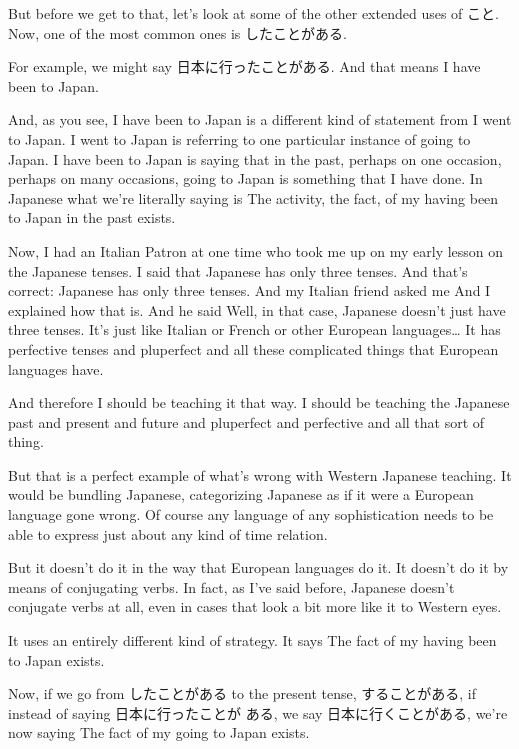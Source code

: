But before we get to that, let's look at some of the other extended uses of こと. Now, one of the most common ones is したことがある.{}

For example, we might say 日本に行ったことがある. And that means I have been to Japan.

And, as you see, I have been to Japan is a different kind of statement from I went to Japan. I went to Japan is referring to one particular instance of going to Japan. I have been to Japan is saying that in the past, perhaps on one occasion, perhaps on many occasions, going to Japan is something that I have done. In Japanese what we're literally saying is The activity, the fact, of my having been to Japan in the past exists.

Now, I had an Italian Patron at one time who took me up on my early lesson on the Japanese tenses. I said that Japanese has only three tenses. And that's correct: Japanese has only three tenses. And my Italian friend asked me  And I explained how that is. And he said Well, in that case, Japanese doesn't just have three tenses. It's just like Italian or French or other European languages\ldots{} It has perfective tenses and pluperfect and all these complicated things that European languages have.

And therefore I should be teaching it that way. I should be teaching the Japanese past and present and future and pluperfect and perfective and all that sort of thing.

But that is a perfect example of what's wrong with Western Japanese teaching. It would be bundling Japanese, categorizing Japanese as if it were a European language gone wrong. Of course any language of any sophistication needs to be able to express just about any kind of time relation.

But it doesn't do it in the way that European languages do it. It doesn't do it by means of conjugating verbs. In fact, as I've said before, Japanese doesn't conjugate verbs at all, even in cases that look a bit more like it to Western eyes.

{}

It uses an entirely different kind of strategy. It says The fact of my having been to Japan exists.

Now, if we go from したことがある to the present tense, することがある, if instead of saying 日本に行ったことが ある, we say 日本に行くことがある, we're now saying The fact of my going to Japan exists.


